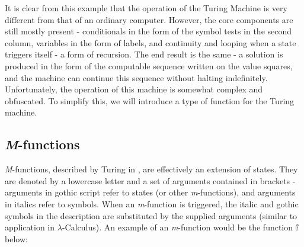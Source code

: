 \documentclass[Master.tex]{subfiles}
\begin{document}
It is clear from this example that the operation of the Turing Machine is very different from that of an ordinary computer. However, the core components are still mostly present - conditionals in the form of the symbol tests in the second column, variables in the form of labels, and continuity and looping when a state triggers itself - a form of recursion. The end result is the same - a solution is produced in the form of the computable sequence written on the value squares, and the machine can continue this sequence without halting indefinitely. Unfortunately, the operation of this machine is somewhat complex and obfuscated. To simplify this, we will introduce a type of function for the Turing machine.

\subsection{\textit{M}-functions}\label{sec:mfunctions}

\textit{M}-functions, described by Turing in \cite{turing1936computablenumbers}, are effectively an extension of states. They are denoted by a lowercase letter and a set of arguments contained in brackets - arguments in gothic script refer to states (or other \textit{m}-functions), and arguments in italics refer to symbols. When an \textit{m}-function is triggered, the italic and gothic symbols in the description are substituted by the supplied arguments (similar to application in $\lambda$-Calculus). An example of an \textit{m}-function would be the function $\mathbb{f}$ below: \cite{turing1936computablenumbers}
\end{document}
